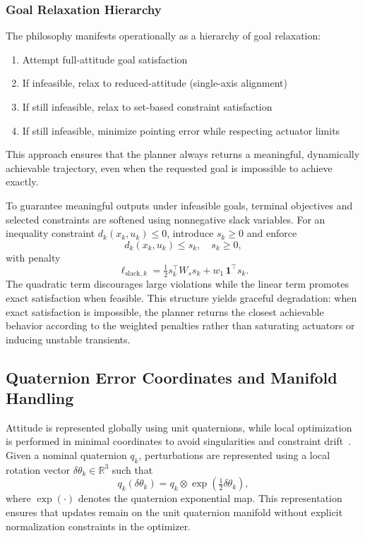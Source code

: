 \documentclass[conference]{IEEEtran}
\begin{document}
\subsubsection{Goal Relaxation Hierarchy}
The philosophy manifests operationally as a hierarchy of goal relaxation:
\begin{enumerate}
    \item Attempt full-attitude goal satisfaction
    \item If infeasible, relax to reduced-attitude (single-axis alignment)
    \item If still infeasible, relax to set-based constraint satisfaction
    \item If still infeasible, minimize pointing error while respecting actuator limits
\end{enumerate}
This approach ensures that the planner always returns a meaningful, dynamically achievable trajectory, even when the requested goal is impossible to achieve exactly.

To guarantee meaningful outputs under infeasible goals, terminal objectives and selected constraints are softened using nonnegative slack variables. For an inequality constraint $d_k(x_k,u_k)\le 0$, introduce $s_k\ge 0$ and enforce
\begin{equation}\label{eq:slack_constraint}
    d_k(x_k,u_k) \le s_k, \quad s_k \ge 0,
\end{equation}
with penalty
\begin{equation}\label{eq:slack_penalty}
    \ell_{\mathrm{slack},k} = \tfrac{1}{2} s_k^\top W_s s_k + w_1\,\mathbf{1}^\top s_k.
\end{equation}
The quadratic term discourages large violations while the linear term promotes exact satisfaction when feasible. This structure yields graceful degradation: when exact satisfaction is impossible, the planner returns the closest achievable behavior according to the weighted penalties rather than saturating actuators or inducing unstable transients.

\subsection{Quaternion Error Coordinates and Manifold Handling}\label{subsec:quaternion_handling}

Attitude is represented globally using unit quaternions, while local optimization is performed in minimal coordinates to avoid singularities and constraint drift~\cite{sola_quaternion_2017,jackson_planning_2021}. Given a nominal quaternion $q_k$, perturbations are represented using a local rotation vector $\delta\theta_k\in\mathbb{R}^3$ such that
\begin{equation}\label{eq:quat_perturbation}
    q_k(\delta\theta_k) = q_k \otimes \exp\left(\tfrac{1}{2}\delta\theta_k\right),
\end{equation}
where $\exp(\cdot)$ denotes the quaternion exponential map. This representation ensures that updates remain on the unit quaternion manifold without explicit normalization constraints in the optimizer.
\end{document}
